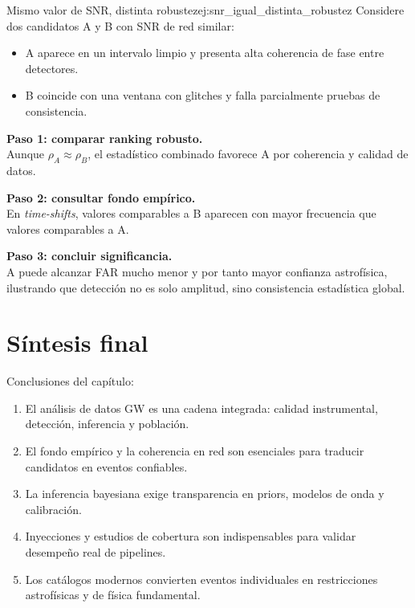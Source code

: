 \begin{ejemplo}{Mismo valor de SNR, distinta robustez}{ej:snr_igual_distinta_robustez}
Considere dos candidatos A y B con SNR de red similar:
\begin{itemize}[leftmargin=2em]
  \item A aparece en un intervalo limpio y presenta alta coherencia de fase entre detectores.
  \item B coincide con una ventana con glitches y falla parcialmente pruebas de consistencia.
\end{itemize}

\textbf{Paso 1: comparar ranking robusto.} \\
Aunque $\rho_A\approx\rho_B$, el estadístico combinado favorece A por coherencia y calidad de datos.

\textbf{Paso 2: consultar fondo empírico.} \\
En \emph{time-shifts}, valores comparables a B aparecen con mayor frecuencia que valores comparables a A.

\textbf{Paso 3: concluir significancia.} \\
A puede alcanzar FAR mucho menor y por tanto mayor confianza astrofísica, ilustrando que detección no es solo amplitud, sino consistencia estadística global.
\end{ejemplo}

\section{Síntesis final}
\label{sec:sintesis_cap19}

Conclusiones del capítulo:
\begin{enumerate}[leftmargin=2em, label=\textbf{\arabic*.}]
  \item El análisis de datos GW es una cadena integrada: calidad instrumental, detección, inferencia y población.
  \item El fondo empírico y la coherencia en red son esenciales para traducir candidatos en eventos confiables.
  \item La inferencia bayesiana exige transparencia en priors, modelos de onda y calibración.
  \item Inyecciones y estudios de cobertura son indispensables para validar desempeño real de pipelines.
  \item Los catálogos modernos convierten eventos individuales en restricciones astrofísicas y de física fundamental.
\end{enumerate}


